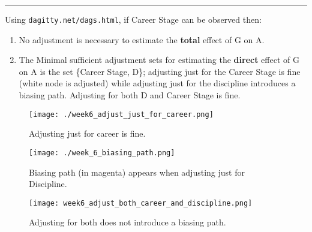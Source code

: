 \documentclass[]{article}
\begin{document}
\begin{center}\rule{0.5\linewidth}{0.5pt}\end{center}

Using \texttt{dagitty.net/dags.html}, if Career Stage can be observed
then:

\begin{enumerate}
\def\labelenumi{\arabic{enumi}.}
\item
  No adjustment is necessary to estimate the \textbf{total} effect of G
  on A.
\item
  The Minimal sufficient adjustment sets for estimating the
  \textbf{direct} effect of G on A is the set \{Career Stage, D\};
  adjusting just for the Career Stage is fine (white node is adjusted)
  while adjusting just for the discipline introduces a biasing path.
  Adjusting for both D and Career Stage is fine.
\end{enumerate}

\begin{figure}[htbp]
\centering
\texttt{[image: ./week6\_adjust\_just\_for\_career.png]}
\caption{Adjusting just for career is fine.}
\end{figure}

\begin{figure}[htbp]
\centering
\texttt{[image: ./week\_6\_biasing\_path.png]}
\caption{Biasing path (in magenta) appears when adjusting just for
Discipline.}
\end{figure}

\begin{figure}[htbp]
\centering
\texttt{[image: week6\_adjust\_both\_career\_and\_discipline.png]}
\caption{Adjusting for both does not introduce a biasing path.}
\end{figure}
\end{document}
